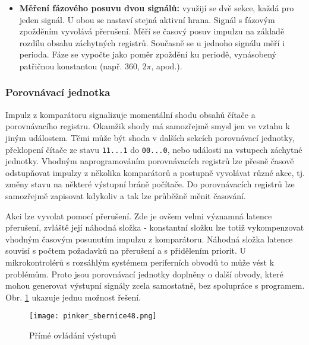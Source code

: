 \begin{itemize}
          \item \textbf{Měření fázového posuvu dvou signálů:}  využijí se dvě sekce, každá pro  
                jeden signál. U obou se nastaví stejná aktivní hrana. Signál s fázovým zpožděním 
                vyvolává přerušení. Měří se časový posuv impulzu na základě rozdílu obsahu 
                záchytných registrů. Současně se u jednoho signálu měří i perioda. Fáze se vypočte 
                jako poměr zpoždění ku periodě, vynásobený patřičnou konstantou (např. 360, 
                \(2\pi\), apod.).
        \end{itemize}
        
      \subsubsection{Porovnávací jednotka}
        Impulz z komparátoru signalizuje momentální shodu obsahů čítače a porovnávacího registru. 
        Okamžik shody má samozřejmě smysl jen ve vztahu k jiným událostem. Těmi může být shoda v 
        dalších sekcích porovnávací jednotky, překlopení čítače ze stavu \texttt{11...1} do 
        \texttt{00...0}, nebo události na vstupech záchytné jednotky. Vhodným naprogramováním 
        porovnávacích registrů lze přesně časově odstupňovat impulzy z několika komparátorů a 
        postupně vyvolávat různé akce, tj. změny stavu na některé výstupní bráně počítače. Do 
        porovnávacích registrů lze samozřejmě zapisovat kdykoliv a tak lze průběžně měnit časování.
        
        Akci lze vyvolat pomocí přerušení. Zde je ovšem velmi významná latence přerušení, zvláště 
        její náhodná složka - konstantní složku lze totiž vykompenzovat vhodným časovým posunutím 
        impulzu z komparátoru. Náhodná složka latence souvisí s počtem požadavků na přerušení a s 
        přidělením priorit. U mikrokontrolérů s rozsáhlým systémem periferních obvodů to může vést 
        k problémům. Proto jsou porovnávací jednotky doplněny o další obvody, které mohou generovat 
        výstupní signály zcela samostatně, bez spolupráce s programem. Obr. 
        \ref{MIT:fig_sbernice48} ukazuje jednu možnost řešení.
        
        \begin{figure}[ht!] %
          \centering
          \texttt{[image: pinker\_sbernice48.png]}
          \caption{Přímé ovládání výstupů}
          \label{MIT:fig_sbernice48}
        \end{figure}
        
